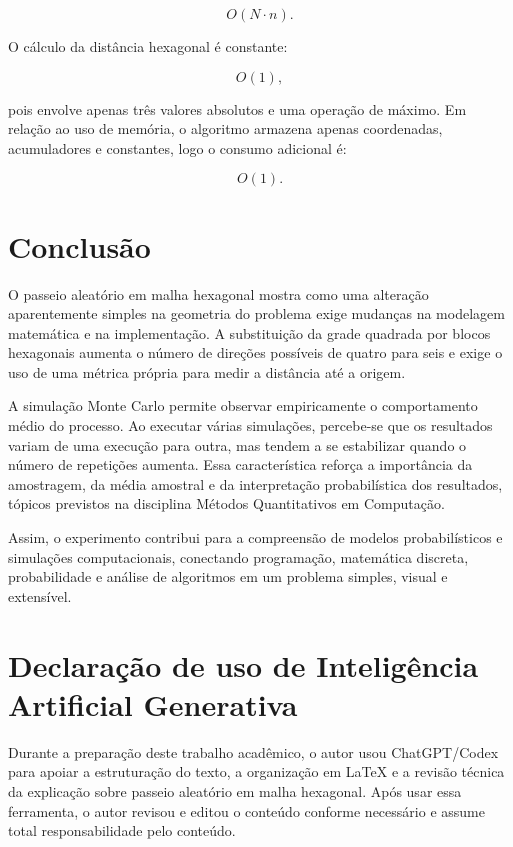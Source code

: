 \documentclass[12pt,a4paper]{article}
\newcommand{\disciplina}{Métodos Quantitativos em Computação}
\begin{document}
\[
O(N\cdot n).
\]

O cálculo da distância hexagonal é constante:

\[
O(1),
\]

pois envolve apenas três valores absolutos e uma operação de máximo. Em relação ao uso de memória, o algoritmo armazena apenas coordenadas, acumuladores e constantes, logo o consumo adicional é:

\[
O(1).
\]

\section{Conclusão}

O passeio aleatório em malha hexagonal mostra como uma alteração aparentemente simples na geometria do problema exige mudanças na modelagem matemática e na implementação. A substituição da grade quadrada por blocos hexagonais aumenta o número de direções possíveis de quatro para seis e exige o uso de uma métrica própria para medir a distância até a origem.

A simulação Monte Carlo permite observar empiricamente o comportamento médio do processo. Ao executar várias simulações, percebe-se que os resultados variam de uma execução para outra, mas tendem a se estabilizar quando o número de repetições aumenta. Essa característica reforça a importância da amostragem, da média amostral e da interpretação probabilística dos resultados, tópicos previstos na disciplina \disciplina.

Assim, o experimento contribui para a compreensão de modelos probabilísticos e simulações computacionais, conectando programação, matemática discreta, probabilidade e análise de algoritmos em um problema simples, visual e extensível.

\section*{Declaração de uso de Inteligência Artificial Generativa}

Durante a preparação deste trabalho acadêmico, o autor usou ChatGPT/Codex para apoiar a estruturação do texto, a organização em LaTeX e a revisão técnica da explicação sobre passeio aleatório em malha hexagonal. Após usar essa ferramenta, o autor revisou e editou o conteúdo conforme necessário e assume total responsabilidade pelo conteúdo.
\end{document}
